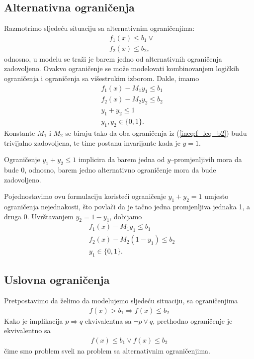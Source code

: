 \documentclass[b5paper, utf8, 11pt, colorlinks]{book}
\theoremstyle{definition}
\begin{document}

\subsection{Alternativna ograničenja} 

Razmotrimo sljedeću situaciju sa alternativnim ograničenjima:
\begin{align}
	&f_1(x) \leq b_1 \vee \nonumber\\
	&f_2(x) \leq b_2,\label{ineq:f_leq_b2}
\end{align}
odnosno, u modelu se traži je barem jedno od alternativnih ograničenja zadovoljeno. 
Ovakvo ograničenje se može modelovati kombinovanjem logičkih ograničenja i ograničenja sa višestrukim izborom. Dakle, imamo 
\begin{align*}
	&f_1(x) - M_1 y_1  \leq b_1 \\
	&f_2(x) - M_2 y_2  \leq b_2 \\
	& y_1 + y_2 \leq 1 \\
	& y_1, y_2 \in \{0, 1\}.
\end{align*}
Konstante $M_1$ i $M_2$ se biraju tako da oba ograničenja iz (\ref{ineq:f_leq_b2})  budu trivijalno zadovoljena, te time postanu invarijante kada je $y=1$.

Ograničenje $y_1 + y_2 \leq 1$ implicira da barem jedna od $y$--promjenljivih mora da bude 0, odnosno, barem jedno alternativno ograničenje mora da bude zadovoljeno. 

Pojednostavimo ovu formulaciju koristeći ograničenje $y_1 + y_2 = 1$ umjesto ograničenja nejednakosti, što povlači da je tačno jedna promjenljiva jednaka 1, a druga 0. Uvrštavanjem $y_2 =  1-y_1$,  dobijamo 
\begin{align*}
	& f_1(x) - M_1 y_1       \leq b_1 \\
	& f_2(x) - M_2 (1-y_1)   \leq b_2  \\
	& y_1 \in \{0,1 \}.
\end{align*}

\subsection{Uslovna ograničenja} 
Pretpostavimo da želimo da modelujemo sljedeću situaciju, sa ograničenjima 
\begin{align*}
	f(x) > b_1 \Rightarrow f(x) \leq b_2 
\end{align*}
Kako je implikacija $p \Rightarrow q$ ekvivalentna sa $\neg p \vee q$, prethodno ograničenje je ekvivalentno sa
\begin{align*}
	f(x) \leq b_1 \vee f(x) \leq b_2 
\end{align*}
čime smo problem sveli na problem sa alternativnim ograničenjima. 
\end{document}
